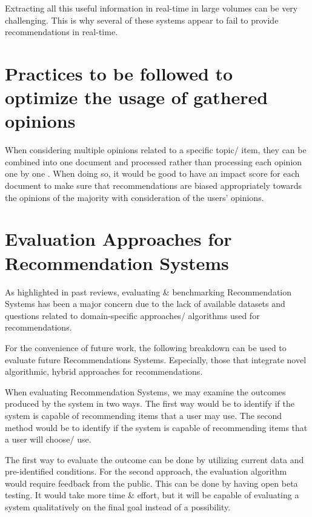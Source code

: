 \documentclass[manuscript,screen,review]{acmart}
\begin{document}
Extracting all this useful information in real-time in large volumes can be very challenging. This is why several of these systems appear to fail to provide recommendations in real-time.

\section{Practices to be followed to optimize the usage of gathered opinions}
When considering multiple opinions related to a specific topic/ item, they can be combined into one document and processed rather than processing each opinion one by one \cite{nah_opinion_2018}. When doing so, it would be good to have an impact score for each document to make sure that recommendations are biased appropriately towards the opinions of the majority with consideration of the users' opinions.



\section{Evaluation Approaches for Recommendation Systems}

As highlighted in past reviews, evaluating \& benchmarking Recommendation Systems has been a major concern due to the lack of available datasets and questions related to domain-specific approaches/ algorithms used for recommendations.

For the convenience of future work, the following breakdown can be used to evaluate future Recommendations Systems. Especially, those that integrate novel algorithmic, hybrid approaches for recommendations.

\bigbreak
When evaluating Recommendation Systems, we may examine the outcomes produced by the system in two ways.
The first way would be to identify if the system is capable of recommending items that a user may use. The second method would be to identify if the system is capable of recommending items that a user will choose/ use.

The first way to evaluate the outcome can be done by utilizing current data and pre-identified conditions. For the second approach, the evaluation algorithm would require feedback from the public. This can be done by having open beta testing. It would take more time \& effort, but it will be capable of evaluating a system qualitatively on the final goal instead of a possibility.
\end{document}
